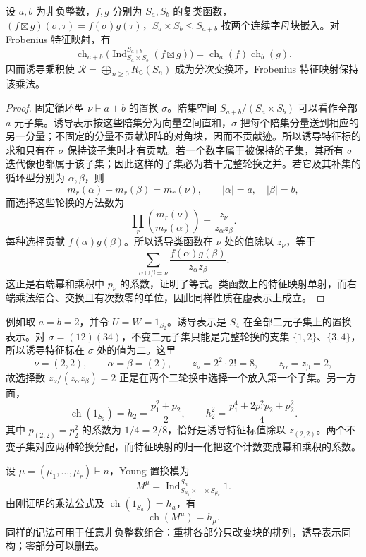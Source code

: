 \begin{proposition}\label{b5:prop:frobenius-induction-product}
	设 \(a,b\) 为非负整数，\(f,g\) 分别为 \(S_a,S_b\) 的复类函数，\((f\boxtimes g)(\sigma,\tau)=f(\sigma)g(\tau)\)，\(S_a\times S_b\le S_{a+b}\) 按两个连续字母块嵌入。对 Frobenius 特征映射，有
	\[
		\operatorname{ch}_{a+b} \bigl(\operatorname{Ind}_{S_a\times S_b}^{S_{a+b}}(f\boxtimes g)\bigr) =\operatorname{ch}_a(f)\operatorname{ch}_b(g).
	\]
	因而诱导乘积使 \(\mathcal R=\bigoplus_{n\ge0}R_{\mathbb C}(S_n)\) 成为分次交换环，Frobenius 特征映射保持该乘法。
\end{proposition}
\begin{proof}
	固定循环型 \(\nu\vdash a+b\) 的置换 \(\sigma\)。陪集空间 \(S_{a+b}/(S_a\times S_b)\) 可以看作全部 \(a\) 元子集。诱导表示按这些陪集分为向量空间直和，\(\sigma\) 把每个陪集分量送到相应的另一分量；不固定的分量不贡献矩阵的对角块，因而不贡献迹。所以诱导特征标的求和只有在 \(\sigma\) 保持该子集时才有贡献。若一个数字属于被保持的子集，其所有 \(\sigma\) 迭代像也都属于该子集；因此这样的子集必为若干完整轮换之并。若它及其补集的循环型分别为 \(\alpha,\beta\)，则
	\[
		m_r(\alpha)+m_r(\beta)=m_r(\nu),\qquad |\alpha|=a,\quad|\beta|=b,
	\]
	而选择这些轮换的方法数为
	\[
		\prod_r\binom{m_r(\nu)}{m_r(\alpha)} =\frac{z_\nu}{z_\alpha z_\beta}.
	\]
	每种选择贡献 \(f(\alpha)g(\beta)\)。所以诱导类函数在 \(\nu\) 处的值除以 \(z_\nu\)，等于
	\[
		\sum_{\alpha\cup\beta=\nu} \frac{f(\alpha)g(\beta)}{z_\alpha z_\beta}.
	\]
	这正是右端幂和乘积中 \(p_\nu\) 的系数，证明了等式。类函数上的特征映射单射，而右端乘法结合、交换且有次数零的单位，因此同样性质在虚表示上成立。
\end{proof}

例如取 \(a=b=2\)，并令 \(U=W=1_{S_2}\)。诱导表示是 \(S_4\) 在全部二元子集上的置换表示。对 \(\sigma=(12)(34)\)，不变二元子集只能是完整轮换的支集 \(\{1,2\}\)、\(\{3,4\}\)，所以诱导特征标在 \(\sigma\) 处的值为二。这里
\[
	\nu=(2,2),\qquad \alpha=\beta=(2),\qquad z_\nu=2^2\cdot2!=8,\qquad z_\alpha=z_\beta=2,
\]
故选择数 \(z_\nu/(z_\alpha z_\beta)=2\) 正是在两个二轮换中选择一个放入第一个子集。另一方面，
\[
	\operatorname{ch}(1_{S_2})=h_2=\frac{p_1^2+p_2}{2},\qquad h_2^2=\frac{p_1^4+2p_1^2p_2+p_2^2}{4}.
\]
其中 \(p_{(2,2)}=p_2^2\) 的系数为 \(1/4=2/8\)，恰好是诱导特征标值除以 \(z_{(2,2)}\)。两个不变子集对应两种轮换分配，而特征映射的归一化把这个计数变成幂和乘积的系数。

\ProseParagraphBreak

设 \(\mu=(\mu_1,\ldots,\mu_r)\vdash n\)，Young 置换模为
\[
	M^\mu=\operatorname{Ind}_{S_{\mu_1}\times\cdots\times S_{\mu_r}}^{S_n}1.
\]
由刚证明的乘法公式及 \(\operatorname{ch}(1_{S_a})=h_a\)，有
\begin{equation}\label{b5:eq:young-permutation-characteristic}
	\operatorname{ch}(M^\mu)=h_\mu.
\end{equation}
同样的记法可用于任意非负整数组合：重排各部分只改变块的排列，诱导表示同构；零部分可以删去。

